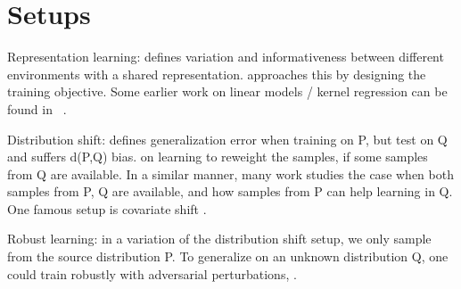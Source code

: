 \section{Setups}

Representation learning:\cite{ye2021towards} defines variation and informativeness between different environments with a shared representation. \cite{arjovsky2019invariant} approaches this by designing the training objective. Some earlier work on linear models / kernel regression can be found in ~\cite{du2017hypothesis, lei2021near}.


Distribution shift: \cite{mansour2009domain} defines generalization error when training on P, but test on Q and suffers d(P,Q) bias. \cite{cortes2010learning} on learning to reweight the samples, if some samples from Q are available. 
In a similar manner, many work studies the case when both samples from P, Q are available, and how samples from P can help learning in Q. One famous setup is covariate shift \cite{kpotufe2021marginal,ma2023optimally}. 

Robust learning: in a variation of the distribution shift setup,  we only sample from the source distribution P. To generalize on an unknown distribution Q, one could train robustly with adversarial perturbations, \cite{madry2017towards, raghunathan2020understanding}.

